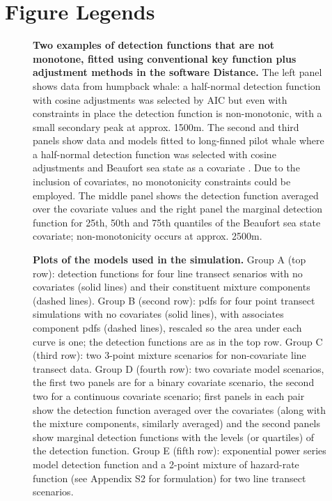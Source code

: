 \documentclass[10pt]{article}
\begin{document}
\section*{Figure Legends}

\begin{figure}[!ht]
\centering
\caption{
{\bf Two examples of detection functions that are not monotone, fitted using conventional key function plus adjustment methods in the software Distance.} The left panel shows data from humpback whale: a half-normal detection function with cosine adjustments was selected by AIC \cite{Williams:2007tc} but even with constraints in place the detection function is non-monotonic, with a small secondary peak at approx. 1500m. The second and third panels show data and models fitted to long-finned pilot whale where a half-normal detection function was selected with cosine adjustments and Beaufort sea state as a covariate \cite{Pike:2003ug}. Due to the inclusion of covariates, no monotonicity constraints could be employed.  The middle panel shows the detection function averaged over the covariate values and the right panel the marginal detection function for 25th, 50th and 75th quantiles of the Beaufort sea state covariate; non-monotonicity occurs at approx. 2500m.
}
\label{fig1}
\end{figure}


\begin{figure}[!ht]
\centering
\caption{
{\bf Plots of the models used in the simulation.} Group A (top row): detection functions for four line transect senarios with no covariates (solid lines) and their constituent mixture components (dashed lines). Group B (second row): pdfs for four point transect simulations with no covariates (solid lines), with associates component pdfs (dashed lines), rescaled so the area under each curve is one; the detection functions are as in the top row. Group C (third row): two 3-point mixture scenarios for non-covariate line transect data. Group D (fourth row): two covariate model scenarios, the first two panels are for a binary covariate scenario, the second two for a continuous covariate scenario; first panels in each pair show the detection function averaged over the covariates (along with the mixture components, similarly averaged) and the second panels show marginal detection functions with the levels (or quartiles) of the detection function.  Group E (fifth row): exponential power series model detection function and a 2-point mixture of hazard-rate function (see Appendix S2 for formulation) for two line transect scenarios.
}
\label{sim-detfcts}
\end{figure}
\end{document}
